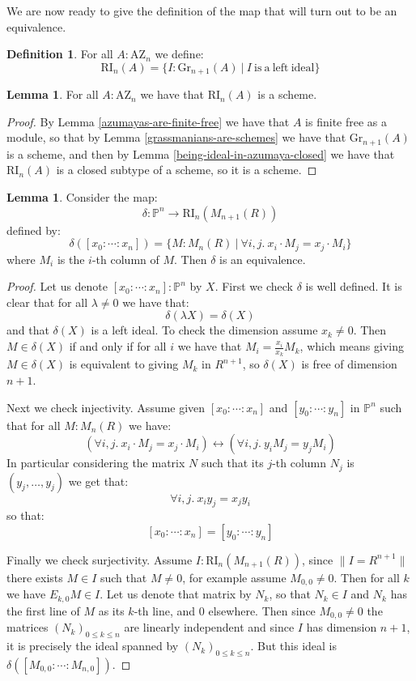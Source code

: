 \documentclass[10pt,a4paper]{article}
\theoremstyle{definition}
\newtheorem{lemma}[theorem]{Lemma}
\newtheorem{definition}[theorem]{Definition}
\newcommand{\Gr}{\mathrm{Gr}}
\newcommand{\RI}{\mathrm{RI}}
\newcommand{\AZ}{\mathrm{AZ}}
\newcommand{\propTrunc}[1]{\lVert #1 \rVert}
\newcommand{\bP}{\mathbb{P}}
\begin{document}
We are now ready to give the definition of the map that will turn out to be an equivalence.

\begin{definition}
For all $A:\AZ_n$ we define:
\[\RI_n(A) = \{I:\Gr_{n+1}(A)\ |\ I\ \mathrm{is\ a\ left\ ideal}\}\]
\end{definition}

\begin{lemma}\label{severi-brauer-are-schemes}
For all $A:\AZ_n$ we have that $\RI_n(A)$ is a scheme.
\end{lemma}

\begin{proof}
By Lemma \ref{azumayas-are-finite-free} we have that $A$ is finite free as a module, so that by Lemma \ref{grassmanians-are-schemes} we have that $\Gr_{n+1}(A)$ is a scheme, and then by Lemma \ref{being-ideal-in-azumaya-closed} we have that $\RI_n(A)$ is a closed subtype of a scheme, so it is a scheme.
\end{proof}

\begin{lemma}\label{right-ideal-of-matrices-are-projective}
Consider the map:
\[\delta:\bP^n \to \RI_n(M_{n+1}(R))\]
defined by:
\[\delta([x_0:\cdots:x_n]) = \{M:M_n(R)\ |\ \forall i,j.\ x_i\cdot M_j = x_j\cdot M_i\}\]
where $M_i$ is the $i$-th column of $M$. Then $\delta$ is an equivalence.
\end{lemma}

\begin{proof}
Let us denote $[x_0:\cdots:x_n]:\bP^n$ by $X$. First we check $\delta$ is well defined. It is clear that for all $\lambda\not=0$ we have that:
\[\delta(\lambda X) = \delta(X)\]
and that $\delta(X)$ is a left ideal. To check the dimension assume $x_k\not=0$. Then $M\in\delta(X)$ if and only if for all $i$ we have that $M_i = \frac{x_i}{x_k} M_k$, which means giving $M\in\delta(X)$ is equivalent to giving $M_k$ in $R^{n+1}$, so $\delta(X)$ is free of dimension $n+1$.

Next we check injectivity. Assume given $[x_0:\cdots:x_n]$ and $[y_0:\cdots:y_n]$ in $\bP^n$ such that for all $M:M_n(R)$ we have:
\[(\forall i,j.\ x_i\cdot M_j = x_j\cdot M_i) \leftrightarrow (\forall i,j.\ y_i M_j = y_j M_i)\]
In particular considering the matrix $N$ such that its $j$-th column $N_j$ is $(y_j,\hdots,y_j)$ we get that:
\[\forall i,j.\ x_iy_j=x_jy_i\] 
so that:
\[[x_0:\cdots:x_n] = [y_0:\cdots:y_n]\]

Finally we check surjectivity. Assume $I:\RI_n(M_{n+1}(R))$, since $\propTrunc{I=R^{n+1}}$ there exists $M\in I$ such that $M\not=0$, for example assume $M_{0,0}\not=0$. Then for all $k$ we have $E_{k,0}M\in I$. Let us denote that matrix by $N_k$, so that $N_k\in I$ and $N_k$ has the first line of $M$ as its $k$-th line, and $0$ elsewhere. Then since $M_{0,0}\not=0$ the matrices $(N_k)_{0\leq k\leq n}$ are linearly independent and since $I$ has dimension $n+1$, it is precisely the ideal spanned by  $(N_k)_{0\leq k\leq n}$. But this ideal is $\delta([M_{0,0}:\cdots:M_{n,0}])$.
\end{proof}
\end{document}
